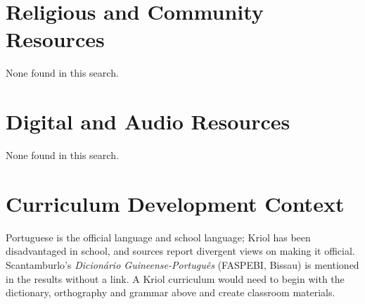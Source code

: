 \documentclass[12pt]{article}
\begin{document}
\section{Religious and Community Resources}
None found in this search.

\section{Digital and Audio Resources}
None found in this search.

\section{Curriculum Development Context}
Portuguese is the official language and school language; Kriol has been disadvantaged in school, and sources report divergent views on making it official. Scantamburlo's \emph{Dicion\'ario Guineense-Portugu\^es} (FASPEBI, Bissau) is mentioned in the results without a link. A Kriol curriculum would need to begin with the dictionary, orthography and grammar above and create classroom materials.
\end{document}
